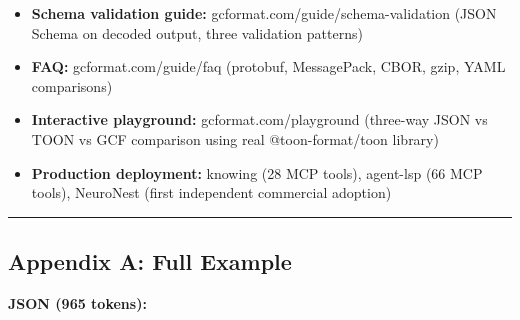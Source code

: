 \documentclass[
  11pt,
  paper=a4,
  ,captions=tableheading
]{scrartcl}
\begin{document}
\begin{itemize}
  \texttt{github.com/blackwell-systems/gcf/tests/cross-language-matrix.py}
  (5x5 encode/decode verification)
\item
  \textbf{Schema validation guide:} gcformat.com/guide/schema-validation
  (JSON Schema on decoded output, three validation patterns)
\item
  \textbf{FAQ:} gcformat.com/guide/faq (protobuf, MessagePack, CBOR,
  gzip, YAML comparisons)
\item
  \textbf{Interactive playground:} gcformat.com/playground (three-way
  JSON vs TOON vs GCF comparison using real @toon-format/toon library)
\item
  \textbf{Production deployment:} knowing (28 MCP tools), agent-lsp (66
  MCP tools), NeuroNest (first independent commercial adoption)
\end{itemize}

\begin{center}\rule{0.5\linewidth}{0.5pt}\end{center}

\subsection{Appendix A: Full Example}\label{appendix-a-full-example}

\textbf{JSON (965 tokens):}
\end{document}
